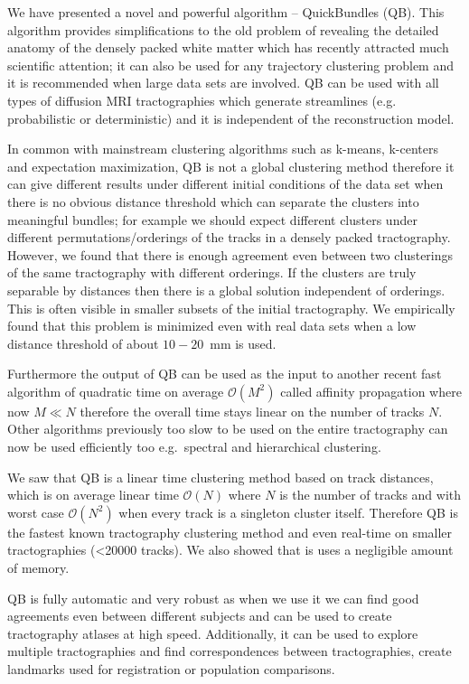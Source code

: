 \documentclass{bioinfo}
\begin{document}
We have presented a novel and powerful algorithm -- QuickBundles
(QB). This algorithm provides simplifications to the old problem of
revealing the detailed anatomy of the densely packed white matter which
has recently attracted much scientific attention; it can also be used
for any trajectory clustering problem and it is recommended when large
data sets are involved. QB can be used with all types of diffusion MRI
tractographies which generate streamlines (e.g. probabilistic or
deterministic) and it is independent of the reconstruction model.

In common with mainstream clustering algorithms such as k-means,
k-centers and expectation maximization, QB is not a global clustering
method therefore it can give different results under different initial
conditions of the data set when there is no obvious distance threshold
which can separate the clusters into meaningful bundles; for example we
should expect different clusters under different permutations/orderings
of the tracks in a densely packed tractography. However, we found that
there is enough agreement even between two clusterings of the same
tractography with different orderings. If the clusters are truly
separable by distances then there is a global solution independent of
orderings. This is often visible in smaller subsets of the initial
tractography. We empirically found that this problem is minimized even
with real data sets when a low distance threshold of about $10-20$~mm is
used.

Furthermore the output of QB can be used as the input to another recent
fast algorithm of quadratic time on average $\mathcal{O}(M^{2})$ called affinity
propagation where now $M\ll N$ therefore the overall time stays linear
on the number of tracks $N$. Other algorithms previously too slow to be
used on the entire tractography can now be used efficiently too
e.g.~spectral and hierarchical clustering.

We saw that QB is a linear time clustering method based on track
distances, which is on average linear time $\mathcal{O}(N)$ where $N$ is
the number of tracks and with worst case $\mathcal{O}(N^{2})$ when every
track is a singleton cluster itself. Therefore QB is the fastest known
tractography clustering method and even real-time on smaller
tractographies (<\num{20000} tracks). We also showed that is uses a negligible amount of
memory.

QB is fully automatic and very robust as when we use it we can find good
agreements even between different subjects and can be used to create
tractography atlases at high speed. Additionally, it can be used to
explore multiple tractographies and find correspondences between
tractographies, create landmarks used for registration or population
comparisons.
\end{document}
